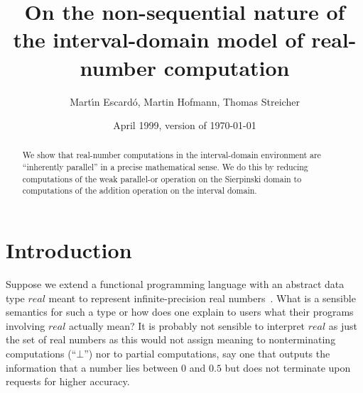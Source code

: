 \documentclass[12pt]{article}
\begin{document}
\title{On the non-sequential nature of \\ the 
  interval-domain model of real-number computation}

  \author{Mart\'\i n Escard\'o, Martin Hofmann, Thomas Streicher}

\date{April 1999, version of \today}

\maketitle

\begin{abstract}
  We show that real-number computations in the interval-domain
  environment are ``inherently parallel'' in a precise mathematical
  sense. We do this by reducing computations of the weak parallel-or
  operation on the Sierpinski domain to computations of the addition
  operation on the interval domain.
\end{abstract}

\section{Introduction}

\newcommand{\bool}{\textit{bool}}
\newcommand{\real}{\textit{real}}

Suppose we extend a functional programming language with an abstract
data type $\real$ meant to represent infinite-precision real
numbers~\cite{boehm:cartwright}.  What is a sensible semantics for
such a type or how does one explain to users what their programs
involving $\real$ actually mean?  It is probably not sensible to
interpret $\real$ as just the set of real numbers as this would not
assign meaning to nonterminating computations (``$\bot$'') nor to
partial computations, say one that outputs the information that a
number lies between $0$ and $0.5$ but does not terminate upon requests
for higher accuracy.
\end{document}
